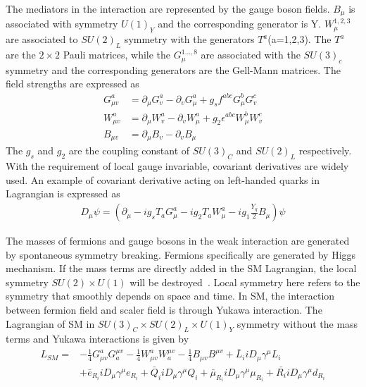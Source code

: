 The mediators in the interaction are represented by the gauge boson fields. $B_{\mu}$ is associated with symmetry $U(1)_{Y}$ and the corresponding generator is Y. $W_{\mu}^{1,2,3}$ are associated to $SU(2)_{L}$ symmetry with the generators $T^{a}$(a=1,2,3). The $T^{a}$ are the $2\times2$ Pauli matrices, while the $G_{\mu}^{1...,8}$ are associated with the $SU(3)_{c}$ symmetry and the corresponding generators are the Gell-Mann matrices.  The field strengths are expressed as 
\begin{equation}
  \begin{aligned}
G^{a}_{\mu v}&=\partial_{\mu}G^{a}_{v}-\partial_{v}G^{a}_{\mu}+g_{s}f^{abc}G^{b}_{\mu}G^{c}_{v}\\
W^{a}_{\mu v}&=\partial_{\mu}W^{a}_{v}-\partial_{v}W^{a}_{\mu}+g_{2}\epsilon^{abc}W^{b}_{\mu}W^{c}_{v}\\
B_{\mu v}       &=\partial_{\mu}B_{v}-\partial_{v}B_{\mu}
  \end{aligned}
\end{equation}
The $g_{s}$ and $g_{2}$ are the coupling constant of $SU(3)_{C}$ and $SU(2)_{L}$ respectively. With the requirement of local gauge invariable, covariant derivatives are widely used. An example of covariant derivative acting on left-handed quarks in Lagrangian is expressed as
\begin{equation}
  \begin{aligned}
D_{\mu}\psi = (\partial_{\mu}-ig_{s}T_{a}G^{a}_{\mu}-ig_{2}T_{a}W^{a}_{\mu}-ig_{1}\frac{Y_{q}}{2}B_{\mu})\psi
  \end{aligned}
\end{equation} 


The masses of fermions and gauge bosons in the weak interaction are generated by spontaneous symmetry breaking. Fermions specifically are generated by Higgs mechanism.  If the mass terms are directly added in the SM Lagrangian, the local symmetry $SU(2)\times U(1)$ will be destroyed~\cite{DJOUADI20081}. Local symmetry here refers to the symmetry that smoothly depends on space and time. In SM, the interaction between fermion field and scaler field is through Yukawa interaction. The Lagrangian of SM in $SU(3)_{C}\times SU(2)_{L}\times U(1)_{Y}$ symmetry without the mass terms and Yukawa interactions is given by
 \begin{equation}
  \begin{aligned}
L_{SM}=&-\frac{1}{4}G^{a}_{\mu v}G^{\mu v}_{a}-\frac{1}{4}W^{a}_{\mu v}W^{\mu v}_{a}-\frac{1}{4}B_{\mu v}B^{\mu v}+\bar{L}_{i}iD_{\mu}\gamma^{\mu}L_{i}\\
              &+\bar{e}_{R_{i}}iD_{\mu}\gamma^{\mu}e_{R_{i}}+\bar{Q}_{i}iD_{\mu}\gamma^{\mu}Q_{i}+\bar{\mu}_{R_{i}}iD_{\mu}\gamma^{\mu}\mu_{R_{i}}+\bar{R_{i}}iD_{\mu}\gamma^{\mu}d_{R_{i}}
  \end{aligned}
\end{equation} 






